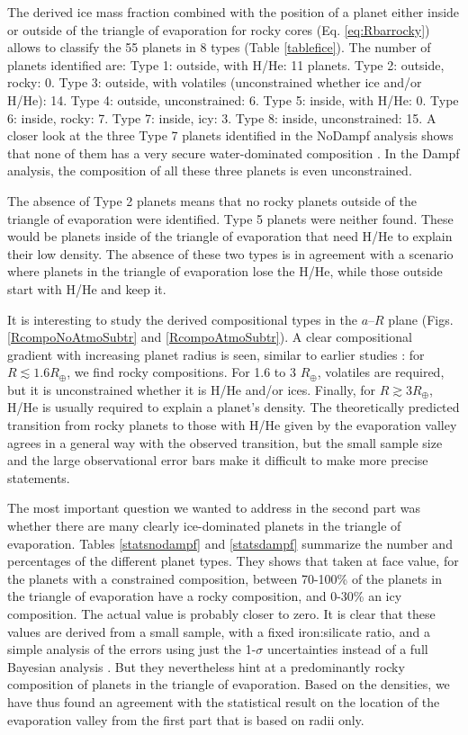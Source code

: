 \documentclass[]{emulateapj}
\def\rearth{R_{\oplus}}
\begin{document}
The derived ice mass fraction combined with the position of a planet either inside or outside of the triangle of evaporation for rocky cores (Eq. \ref{eq:Rbarrocky}) allows to classify the 55 planets in 8 types (Table \ref{tablefice}). The  number of planets identified are:  Type 1: outside, with H/He: 11 planets. Type 2: outside, rocky: 0. Type 3: outside, with volatiles (unconstrained whether ice and/or H/He): 14. Type 4: outside, unconstrained:  6. Type 5: inside, with H/He: 0. Type 6: inside, rocky: 7. Type 7: inside, icy: 3. Type 8: inside, unconstrained: 15. A closer look at the three Type 7 planets identified in the NoDampf analysis shows that none of them has a very secure water-dominated composition \citep[cf.][]{Dorn2017b,Lopez2016}. In the Dampf analysis, the composition of all these three planets is even unconstrained. 

The absence of Type 2 planets means that no rocky planets outside of the triangle of evaporation were identified.  Type  5 planets were neither found. {These} would be planets inside of the triangle of evaporation that need H/He to explain their low density. The absence of these two types is in agreement with a scenario where planets in the triangle of evaporation lose the H/He, while those outside start with H/He and keep it.

It is interesting to {study} the derived compositional types in the $a$--$R$ plane (Figs. \ref{RcompoNoAtmoSubtr} and \ref{RcompoAtmoSubtr}). A clear compositional gradient with increasing planet radius is seen, similar to earlier studies \citep[e.g.,][]{Marcy2014,Rogers2015,WolfgangLopez2015}: for $R\lesssim 1.6 \rearth$, we find rocky compositions. For 1.6 to 3 $\rearth$, volatiles are required, but it is  unconstrained whether it is H/He and/or ices. Finally, for $R\gtrsim 3 \rearth$, H/He is usually required to explain a planet's density. The theoretically predicted transition from rocky planets to those with H/He given by the evaporation valley agrees in a general way  with the observed  transition, but the small sample size and the large observational error bars make it difficult to make more precise statements.

The most important question we wanted to address in the second part was whether there are many clearly ice-dominated planets in the triangle of evaporation. Tables \ref{statsnodampf} and \ref{statsdampf}  summarize the number and percentages of the different planet types. They shows that taken at face value, for the planets with a constrained composition, between 70-100\% of the planets in the triangle of evaporation have a rocky composition, and 0-30\% an icy composition. The actual value is probably closer to zero. It is clear that these values are derived from a small sample, with a fixed iron:silicate ratio, and a simple analysis of the errors using just the 1-$\sigma$ uncertainties instead of a full Bayesian analysis \citep[e.g.,][]{Rogers2015,Dorn2017a}. But they nevertheless hint at a  predominantly rocky composition of planets in the triangle of evaporation. Based on the densities, we have thus found an agreement with the statistical result on the location of the evaporation valley from the first part that is based on radii only.
\end{document}
